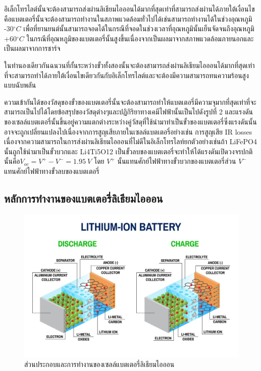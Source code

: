 \begin{itemize}
 {\item 
 	อิเล็กโทรไลต์นั้นจะต้องสามารถส่งผ่านลิเธียมไอออนได้มากที่สุดเท่าที่สามารถส่งผ่านได้ภายใต้เงื่อนไขคือแบตเตอรี่นั้นจะต้องสามารถทำงานในสภาพแวดล้อมทั่วไปได้เช่นสามารถทำงานได้ในช่วงอุณหภูมิ -30$^\circ C$ 	 	     เพื่อที่ยานยนต์นั้นสามารถจอดได้ในกรณีที่จอดในช่วงเวลาที่อุณหภูมินั้นเย็นจัดจนถึงอุณหภูมิ +60$^\circ C$ ในกรณีที่อุณหภูมิของแบตเตอรี่นั้นสูงขึ้นเนื่องจากเป็นผลมาจากสภาพแวดล้อมภายนอกและเป็นผลมาจากการชาร์จ}
 {\item 
 	ในทำนองเดียวกันฉนวนที่กั้นระหว่างขั้วทั้งสองนั้นจะต้องสามารถส่งผ่านลิเธียมไอออนได้มากที่สุดเท่าที่จะสามารถทำได้ภายใต้เงื่อนไขเดียวกันกับอิเล็กโทรไลต์และจะต้องมีความสามารถทนความร้อนสูงแบบฉับพลัน
 }
 {\item 
 	ความเข้ากันได้ของวัสดุของขั้วของแบตเตอรี่นั้นจะต้องสามารถทำให้แบตเตอรี่มีความจุมากที่สุดเท่าที่จะสามารถเป็นไปได้โดยข้อสรุปของวัสดุต่างๆและปฏิกิริยาทางเคมีไฟฟ้านั้นเป็นไปดังรูปที่ 2 	       และแรงดันของเซลล์แบตเตอรี่นั้นขึ้นอยู่ความแตกต่างระหว่างคู่วัสดุที่ใช้นำมาทำเป็นขั้วของแบตเตอรี่ซึ่งแรงดันนั้นอาจจะถูกเปลี่ยนแปลงไปเนื่องจากการสูญเสียภายในเซลล์แบตเตอรี่อย่างเช่น การสูญเสีย IR losses เนื่องจากความสามารถในการส่งผ่านลิเธียมไอออนที่ไม่ดีในอิเล็กโทรไลท์ยกตัวอย่างเช่นถ้า LiFePO4 นั้นถูกใช้นำมาเป็นขั้วบวกและ Li4Ti5O12 เป็นขั้วลบของแบตเตอรี่จะทำให้ได้แรงดันเปิดวงจรปกตินั้นคือ$V_{oc}=V^+-V^-=1.95\ V$ โดย $V^+$ นั้นแทนศักย์ไฟฟ้าทางขั้วบวกของแบตเตอรี่ส่วน $V^-$ แทนศักย์ไฟฟ้าทางขั้วลบของแบตเตอรี่
 }
\end{itemize}


\subsection{หลักการทำงานของแบตเตอรี่ลิเธียมไอออน}
\begin{center}
	\begin{figure}[!h]
		\includegraphics[width=0.6\linewidth]{Chapters/img/battery_structure.png}
			\centering
			\captionsetup{justification=centering,margin=2cm}
			\caption{ส่วนประกอบและการทำงานของเซลล์แบตเตอรี่ลิเธียมไอออน}
			\label{fig:Battery_Struc}
	\end{figure}
\end{center}


